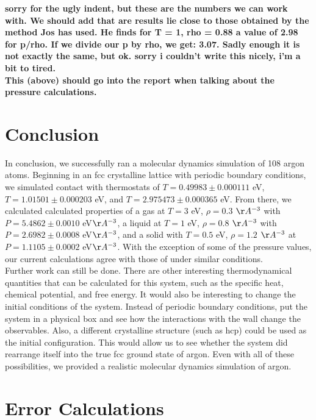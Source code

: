 \documentclass{article}
\begin{document}
\begin{multicols}{2}
\textbf{sorry for the ugly indent, but these are the numbers we can work with. We should add that are results lie close to those obtained by the method Jos has used. He finds for T = 1, rho = 0.88 a value of 2.98 for p/rho. If we divide our p by rho, we get: 3.07. Sadly enough it is not exactly the same, but ok. sorry i couldn't write this nicely, i'm a bit to tired.}\\

\textbf{This (above) should go into the report when talking about the pressure calculations.}

\section{Conclusion}
\label{conc}

In conclusion, we successfully ran a molecular dynamics simulation of 108 argon atoms.  Beginning in an fcc crystalline lattice with periodic boundary conditions, we simulated contact with thermostats of $T=0.49983 \pm 0.000111$ eV, $T= 1.01501 \pm 0.000203$ eV, and $T=2.975473 \pm 0.000365$ eV.  From there, we calculated calculated properties of a gas at $T=3$ eV, $\rho=0.3$ $\AA ^{-3}$ with $P=5.4862 \pm 0.0010 $ eV$\AA^{-3}$, a liquid at $T=1$ eV, $\rho =0.8$ $\AA ^{-3}$ with $P=2.6982 \pm 0.0008$ eV$\AA^{-3}$, and a solid with $T=0.5$ eV, $\rho=1.2$ $\AA ^{-3}$ at $P=1.1105 \pm 0.0002 $ eV$\AA^{-3}$.  With the exception of some of the pressure values, our current calculations agree with those of \cite{thijssen} under similar conditions.  \\

Further work can still be done.  There are other interesting thermodynamical quantities that can be calculated for this system, such as the specific heat, chemical potential, and free energy.  It would also be interesting to change the initial conditions of the system.  Instead of periodic boundary conditions, put the system in a physical box and see how the interactions with the wall change the observables.  Also, a different crystalline structure (such as hcp) could be used as the initial configuration.  This would allow us to see whether the system did rearrange itself into the true fcc ground state of argon.  Even with all of these possibilities, we provided a realistic molecular dynamics simulation of argon.  

\appendix 

\section{Error Calculations}


\end{multicols}
\end{document}
